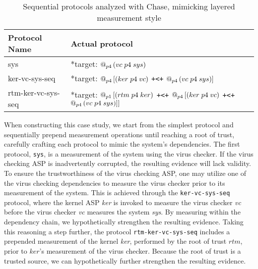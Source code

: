\documentclass[runningheads]{llncs}
\theoremstyle{definition}
\begin{document}
\begin{table}[htbp]
    \setlength\extrarowheight{7pt}
    \centering
    \footnotesize
    \begin{tabular}{|M{3cm}|M{7cm}|N}
        \hline
        Protocol Name & Actual protocol &\\
        \hline
        sys & *target: $\mathop{@_{p4}}{(vc\; p4\; sys)}$  &\\ 
        \hline   
        ker-vc-sys-seq & *target:  $\mathop{@_{p4}}{[(ker\; p4\; vc)}$ \texttt{+<+} $\mathop{@_{p4}}{(vc\; p4\; sys)}]$ &\\ \hline 
        rtm-ker-vc-sys-seq & *target: $\mathop{@_{p1}}{[(rtm\; p4\; ker)}$ \texttt{+<+} $\mathop{@_{p4}}{[(ker\; p4\; vc)}$ \texttt{+<+} $\mathop{@_{p4}}{(vc\; p4\; sys)}]]$ &\\
        \hline
    \end{tabular}
    \caption[Chase Analysis with Varied Dependencies]{Sequential protocols analyzed with Chase, mimicking layered measurement style}
    \label{Chase-table}
\end{table}

When constructing this case study, we start from the simplest protocol and sequentially prepend measurement operations until reaching a root of trust, carefully crafting each protocol to mimic the system's dependencies. The first protocol, \texttt{sys}, is a measurement of the system using the virus checker. If the virus checking ASP is inadvertently corrupted, the resulting evidence will lack validity. To ensure the trustworthiness of the virus checking ASP, one may utilize one of the virus checking dependencies to measure the virus checker prior to its measurement of the system. This is achieved through the \texttt{ker-vc-sys-seq} protocol, where the kernel ASP \emph{ker} is invoked to measure the virus checker \emph{vc} before the virus checker \emph{vc} measures the system \emph{sys}. By measuring within the dependency chain, we hypothetically strengthen the resulting evidence. Taking this reasoning a step further, the protocol \texttt{rtm-ker-vc-sys-seq} includes a prepended measurement of the kernel \emph{ker}, performed by the root of trust $rtm$, prior to $ker$'s measurement of the virus checker. Because the root of trust is a trusted source, we can hypothetically further strengthen the resulting evidence. 
\end{document}
